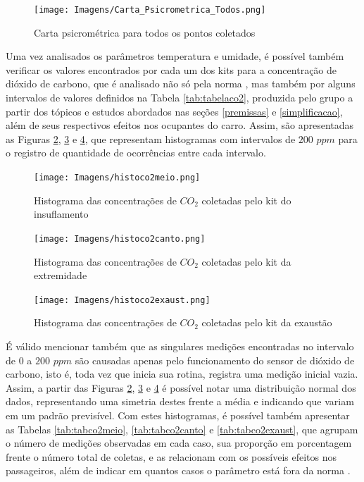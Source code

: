 \documentclass[acronym,symbols,table]{fei}
\begin{document}
\begin{figure}[!htb]
	\centering
	\caption{Carta psicrométrica para todos os pontos coletados}
	\texttt{[image: Imagens/Carta\_Psicrometrica\_Todos.png]}
	\label{fig:Carta_Psicrometrica_Todos}
\end{figure}

Uma vez analisados os parâmetros temperatura e umidade, é possível também verificar os valores encontrados por cada um dos kits para a concentração de dióxido de carbono, que é analisado não só pela norma \textcite{abnt17037}, mas também por alguns intervalos de valores definidos na Tabela \ref{tab:tabelaco2}, produzida pelo grupo a partir dos tópicos e estudos abordados nas seções \ref{premissas} e \ref{simplificacao}, além de seus respectivos efeitos nos ocupantes do carro. Assim, são apresentadas as Figuras \ref{fig:histoco2meio}, \ref{fig:histoco2canto} e \ref{fig:histoco2exaust}, que representam histogramas com intervalos de $200$ $ppm$ para o registro de quantidade de ocorrências entre cada intervalo.

\newpage

\begin{figure}[!htb]
    \centering
    \caption{Histograma das concentrações de ${CO}_{2}$ coletadas pelo kit do insuflamento}
    \texttt{[image: Imagens/histoco2meio.png]}
    \label{fig:histoco2meio}
\end{figure}

\begin{figure}[!htb]
    \centering
    \caption{Histograma das concentrações de ${CO}_{2}$ coletadas pelo kit da extremidade}
    \texttt{[image: Imagens/histoco2canto.png]}
    \label{fig:histoco2canto}
\end{figure}

\begin{figure}[!htb]
    \centering
    \caption{Histograma das concentrações de ${CO}_{2}$ coletadas pelo kit da exaustão}
    \texttt{[image: Imagens/histoco2exaust.png]}
    \label{fig:histoco2exaust}
\end{figure}

\newpage

É válido mencionar também que as singulares medições encontradas no intervalo de $0$ a $200$ $ppm$ são causadas apenas pelo funcionamento do sensor de dióxido de carbono, isto é, toda vez que inicia sua rotina, registra uma medição inicial vazia. Assim, a partir das Figuras \ref{fig:histoco2meio}, \ref{fig:histoco2canto} e \ref{fig:histoco2exaust} é possível notar uma distribuição normal dos dados, representando uma simetria destes frente a média e indicando que variam em um padrão previsível. Com estes histogramas, é possível também apresentar as Tabelas \ref{tab:tabco2meio}, \ref{tab:tabco2canto} e \ref{tab:tabco2exaust}, que agrupam o número de medições observadas em cada caso, sua proporção em porcentagem frente o número total de coletas, e as relacionam com os possíveis efeitos nos passageiros, além de indicar em quantos casos o parâmetro está fora da norma \textcite{abnt17037}.
\end{document}
